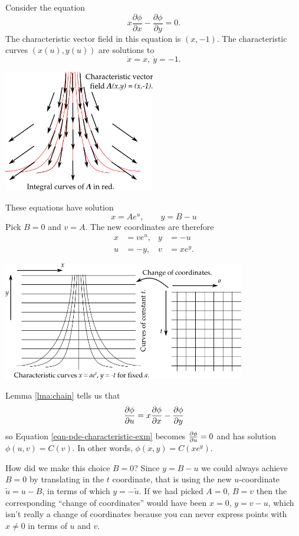 \begin{exm}
Consider the equation
\begin{equation}\label{eqn-pde-characteristic-exm}x\frac{\partial\phi}{\partial x}-\frac{\partial\phi}{\partial y}=0.\end{equation}
The characteristic vector field in this equation is $(x,-1)$. The characteristic curves $(x(u),y(u))$ are solutions to
\[\dot{x}=x,\ \dot{y}=-1.\]

{
\begin{center}
\includegraphics[width=250px]{characteristics2.png}
\end{center}
}

These equations have solution
\[x=Ae^u,\qquad y=B-u\]
Pick $B=0$ and $v=A$. The new coordinates are therefore
\begin{align*}
x&=ve^u,&y&=-u\\
u&=-y,&v&=xe^y.
\end{align*}

{
\begin{center}
\includegraphics[width=400px]{characteristics1.png}
\end{center}
}

Lemma \ref{lma:chain} tells us that
\[\frac{\partial \phi}{\partial u}=x\frac{\partial \phi}{\partial x}-\frac{\partial \phi}{\partial y}\]
so Equation \eqref{eqn-pde-characteristic-exm} becomes $\frac{\partial \phi}{\partial u}=0$ and has solution $\phi(u,v)=C(v)$. In other words, $\phi(x,y)=C(xe^y)$.
\end{exm}

\begin{rmk}\label{rmk:bequalszero}
How did we make this choice $B=0$? Since $y=B-u$ we could always achieve $B=0$ by translating in the $t$ coordinate, that is using the new $u$-coordinate $\tilde{u}=u-B$, in terms of which $y=-\tilde{u}$. If we had picked $A=0$, $B=v$ then the corresponding ``change of coordinates'' would have been $x=0$, $y=v-u$, which isn't really a change of coordinates because you can never express points with $x\neq 0$ in terms of $u$ and $v$.
\end{rmk}

